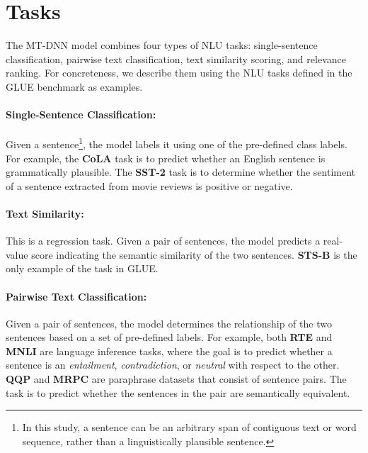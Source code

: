 \section{Tasks}
\label{sec:tasks}

The MT-DNN model combines four types of NLU tasks: single-sentence classification, pairwise text classification, text similarity scoring, and relevance ranking. For concreteness, we describe them using the NLU tasks defined in the GLUE benchmark as examples. 

\paragraph{Single-Sentence Classification:} 
Given a sentence\footnote{In this study, a sentence can be an arbitrary span of contiguous text or word sequence, rather than a linguistically plausible sentence.}, the model labels it using one of the pre-defined class labels. For example, the \textbf{CoLA} task  is to predict whether an English sentence is grammatically plausible. The \textbf{SST-2} task is to determine whether the sentiment of a sentence extracted from movie reviews is positive or negative.

\paragraph{Text Similarity:}
This is a regression task. Given a pair of sentences, the model predicts a real-value score indicating the semantic similarity of the two sentences. \textbf{STS-B} is the only example of the task in GLUE. 

\paragraph{Pairwise Text Classification:} 
Given a pair of sentences, the model determines the relationship of the two sentences based on a set of pre-defined labels. 
For example, both \textbf{RTE} and \textbf{MNLI} are language inference tasks, where the goal is to predict whether a sentence is an \emph{entailment}, \emph{contradiction}, or \emph{neutral} with respect to the other. 
\textbf{QQP} and \textbf{MRPC} are paraphrase datasets that consist of sentence pairs. The task is to predict whether the sentences in the pair are semantically equivalent.

